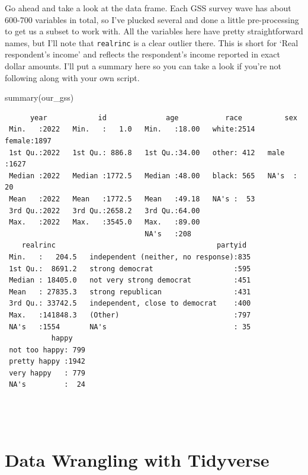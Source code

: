 \documentclass[
  letterpaper,
  DIV=11,
  numbers=noendperiod]{scrreprt}
\newenvironment{Shaded}{\begin{snugshade}}{\end{snugshade}}
\newcommand{\FunctionTok}[1]{\textcolor[rgb]{0.28,0.35,0.67}{#1}}
\newcommand{\NormalTok}[1]{\textcolor[rgb]{0.00,0.23,0.31}{#1}}
\begin{document}
Go ahead and take a look at the data frame. Each GSS survey wave has
about 600-700 variables in total, so I've plucked several and done a
little pre-processing to get us a subset to work with. All the variables
here have pretty straightforward names, but I'll note that
\texttt{realrinc} is a clear outlier there. This is short for `Real
respondent's income' and reflects the respondent's income reported in
exact dollar amounts. I'll put a summary here so you can take a look if
you're not following along with your own script.

\begin{Shaded}
\begin{Highlighting}[]
\FunctionTok{summary}\NormalTok{(our\_gss)}
\end{Highlighting}
\end{Shaded}

\begin{verbatim}
      year            id              age           race          sex      
 Min.   :2022   Min.   :   1.0   Min.   :18.00   white:2514   female:1897  
 1st Qu.:2022   1st Qu.: 886.8   1st Qu.:34.00   other: 412   male  :1627  
 Median :2022   Median :1772.5   Median :48.00   black: 565   NA's  :  20  
 Mean   :2022   Mean   :1772.5   Mean   :49.18   NA's :  53                
 3rd Qu.:2022   3rd Qu.:2658.2   3rd Qu.:64.00                             
 Max.   :2022   Max.   :3545.0   Max.   :89.00                             
                                 NA's   :208                               
    realrinc                                      partyid   
 Min.   :   204.5   independent (neither, no response):835  
 1st Qu.:  8691.2   strong democrat                   :595  
 Median : 18405.0   not very strong democrat          :451  
 Mean   : 27835.3   strong republican                 :431  
 3rd Qu.: 33742.5   independent, close to democrat    :400  
 Max.   :141848.3   (Other)                           :797  
 NA's   :1554       NA's                              : 35  
           happy     
 not too happy: 799  
 pretty happy :1942  
 very happy   : 779  
 NA's         :  24  
                     
                     
                     
\end{verbatim}

\section{Data Wrangling with
Tidyverse}\label{data-wrangling-with-tidyverse}
\end{document}
